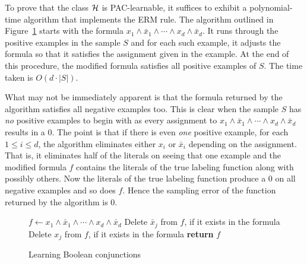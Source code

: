 To prove that the class $\mathcal{H}$ is PAC-learnable, it suffices to exhibit a
polynomial-time algorithm that implements the ERM rule. The algorithm outlined
in Figure~\ref{fig:pac_boolean_conjunctions} starts with the formula $x_1 \land
\bar{x}_1 \land \cdots \land x_d \land \bar{x}_d$. It runs through the positive
examples in the sample $S$ and for each such example, it adjusts the formula so
that it satisfies the assignment given in the example. At the end of this
procedure, the modified formula satisfies all positive examples of $S$. The
time taken is $O(d \cdot |S|)$.

What may not be immediately apparent is that the formula returned by the
algorithm satisfies all negative examples too. This is clear when the sample
$S$ has \emph{no} positive examples to begin with as every assignment to $x_1
\land \bar{x}_1 \land \cdots \land x_d \land \bar{x}_d$ results in a $0$. The
point is that if there is even \emph{one} positive example, for each $1 \leq i
\leq d$, the algorithm eliminates either $x_i$ or $\bar{x}_i$ depending on the
assignment. That is, it eliminates half of the literals on seeing that one
example and the modified formula $f$ contains the literals of the true labeling
function along with possibly others.  Now the literals of the true labeling
function produce a $0$ on all negative examples and so does $f$. Hence the
sampling error of the function returned by the algorithm is $0$.
\begin{figure}
    \begin{algorithmic}[0] %
            \State $f \gets x_1 \land \bar{x}_1 \land \cdots
            \land x_d \land \bar{x}_d$
            			\State Delete $\bar{x}_j$ from $f$, if it exists in the formula
            		\Else
            			\State Delete $x_j$ from $f$, if it exists in the formula
            		\EndIf
             	\EndFor
            \EndFor
            \State \textbf{return} $f$
        \EndProcedure
    \end{algorithmic}
\caption{Learning Boolean conjunctions}
\label{fig:pac_boolean_conjunctions}
\end{figure}


